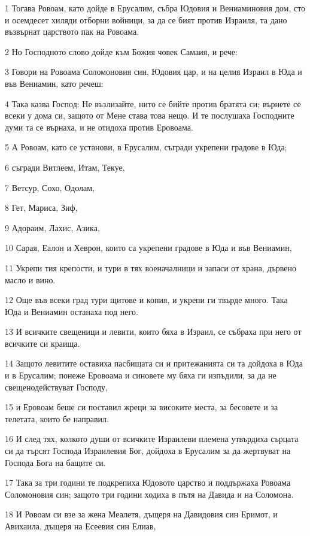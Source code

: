\par 1 Тогава Ровоам, като дойде в Ерусалим, събра Юдовия и Вениаминовия дом, сто и осемдесет хиляди отборни войници, за да се бият против Израиля, та дано възвърнат царството пак на Ровоама.
\par 2 Но Господното слово дойде към Божия човек Самаия, и рече:
\par 3 Говори на Ровоама Соломоновия син, Юдовия цар, и на целия Израил в Юда и във Вениамин, като речеш:
\par 4 Така казва Господ: Не възлизайте, нито се бийте против братята си; върнете се всеки у дома си, защото от Мене става това нещо. И те послушаха Господните думи та се върнаха, и не отидоха против Еровоама.
\par 5 А Ровоам, като се установи, в Ерусалим, съгради укрепени градове в Юда;
\par 6 съгради Витлеем, Итам, Текуе,
\par 7 Ветсур, Сохо, Одолам,
\par 8 Гет, Мариса, Зиф,
\par 9 Адораим, Лахис, Азика,
\par 10 Сарая, Еалон и Хеврон, които са укрепени градове в Юда и във Вениамин,
\par 11 Укрепи тия крепости, и тури в тях военачалници и запаси от храна, дървено масло и вино.
\par 12 Още във всеки град тури щитове и копия, и укрепи ги твърде много. Така Юда и Вениамин останаха под него.
\par 13 И всичките свещеници и левити, които бяха в Израил, се събраха при него от всичките си краища.
\par 14 Защото левитите оставиха пасбищата си и притежанията си та дойдоха в Юда и в Ерусалим; понеже Еровоама и синовете му бяха ги изпъдили, за да не свещенодействуват Господу,
\par 15 и Еровоам беше си поставил жреци за високите места, за бесовете и за телетата, които бе направил.
\par 16 И след тях, колкото души от всичките Израилеви племена утвърдиха сърцата си да търсят Господа Израилевия Бог, дойдоха в Ерусалим за да жертвуват на Господа Бога на бащите си.
\par 17 Така за три години те подкрепиха Юдовото царство и поддържаха Ровоама Соломоновия син; защото три години ходиха в пътя на Давида и на Соломона.
\par 18 И Ровоам си взе за жена Меалетя, дъщеря на Давидовия син Еримот, и Авихаила, дъщеря на Есеевия син Елиав,
